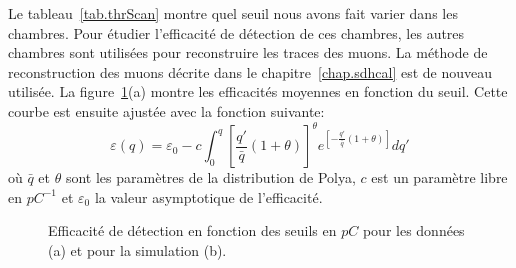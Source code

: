 Le tableau~\ref{tab.thrScan} montre quel seuil nous avons fait varier dans les chambres. Pour étudier l'efficacité de détection de ces chambres, les autres chambres sont utilisées pour reconstruire les traces des muons. La méthode de reconstruction des muons décrite dans le chapitre~\ref{chap.sdhcal} est de nouveau utilisée. La figure~\ref{fig.thrScan}(a) montre les efficacités moyennes en fonction du seuil. Cette courbe est ensuite ajustée avec la fonction suivante:
\begin{equation}
  \label{eq.fitScan}
  \varepsilon(q)=\varepsilon _0 - c\int_0^q{[\frac{q'}{\bar q}(1+\theta)]^{\theta}e^{[-\frac{q'}{\bar q}(1+\theta)]}dq'}
\end{equation}
où $\bar q$ et $\theta$ sont les paramètres de la distribution de Polya, $c$ est un paramètre libre en $pC^{-1}$ et $\varepsilon_0$ la valeur asymptotique de l'efficacité.
\begin{figure}[!ht]
  \caption{Efficacité de détection en fonction des seuils en $pC$ pour les données (a) et pour la simulation (b). \label{fig.thrScan}}
\end{figure}
